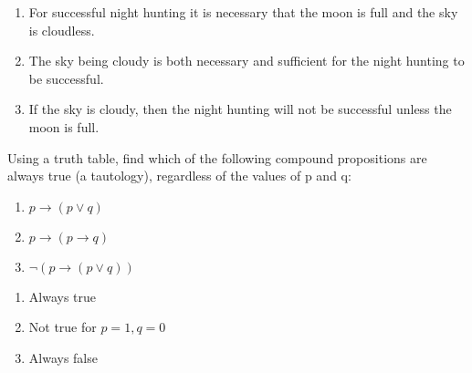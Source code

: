 \documentclass[]{exam}
\begin{document}
\begin{questions}
\begin{parts}

          \begin{solution}
            \begin{enumerate}
              \item For successful night hunting it is necessary that the moon
                is full and the sky is cloudless.
              \item The sky being cloudy is both necessary and sufficient for
                the night hunting to be successful.
              \item  If the sky is cloudy, then the night hunting will not be
                successful unless the moon is full.
            \end{enumerate}
          \end{solution}
      \end{parts}

    \newpage

    \question Using a truth table, find which of the following compound
      propositions are always true (a tautology), regardless of the values of p
      and q: 
      \begin{enumerate} 
        \item $p \rightarrow (p \lor q)$
        \item $p \rightarrow (p \rightarrow q)$
        \item $\lnot (p \rightarrow (p \lor q))$
      \end{enumerate}

      \begin{solution}
        \begin{enumerate} 
          \item Always true
          \item Not true for $p = 1, q = 0$
          \item Always false
        \end{enumerate}
      \end{solution}


\end{questions}
\end{document}
